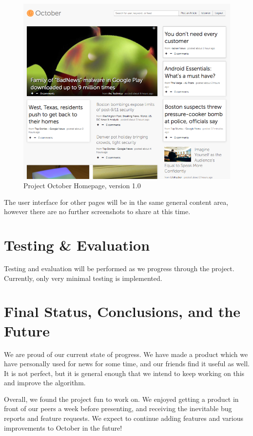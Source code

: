 \documentclass[11pt,letterpaper,titlepage]{article}
\begin{document}
\begin{figure}
\centering
\includegraphics[scale=0.6]{img/homepage-v1.png}
\caption{Project October Homepage, version 1.0}
\label{fig:homepage-v1.0}
\end{figure}

The user interface for other pages will be in the same general content area, however there are no further screenshots to share at this time.

\section{Testing \& Evaluation}
\label{sec:testing}
Testing and evaluation will be performed as we progress through the project. Currently, only very minimal testing is implemented.

\section{Final Status, Conclusions, and the Future}
\label{sec:progress}
We are proud of our current state of progress.
We have made a product which we have personally used for news for some time, and our friends find it useful as well.
It is not perfect, but it is general enough that we intend to keep working on this and improve the algorithm.

Overall, we found the project fun to work on.
We enjoyed getting a product in front of our peers a week before presenting, and receiving the inevitable bug reports and feature requests.
We expect to continue adding features and various improvements to October in the future!
\end{document}
